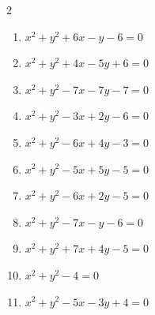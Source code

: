 \begin{multicols}{2}
\begin{enumerate}
  \item $x^{2}+y^{2}+6x-y-6=0$


  \item $x^{2}+y^{2}+4x-5y+6=0$


  \item $x^{2}+y^{2}-7x-7y-7=0$


  \item $x^{2}+y^{2}-3x+2y-6=0$


  \item $x^{2}+y^{2}-6x+4y-3=0$

        \phantom{$\displaystyle 中心\: \left(3,-2\right), \quad 半径 \ 4$}

  \item $x^{2}+y^{2}-5x+5y-5=0$


  \item $x^{2}+y^{2}-6x+2y-5=0$


  \item $x^{2}+y^{2}-7x-y-6=0$


  \item $x^{2}+y^{2}+7x+4y-5=0$


  \item $x^{2}+y^{2}-4=0$

        \phantom{$\displaystyle 中心\: \left(0,0\right), \quad 半径 \ 2$}

  \item $x^{2}+y^{2}-5x-3y+4=0$


\end{enumerate}
\end{multicols}
